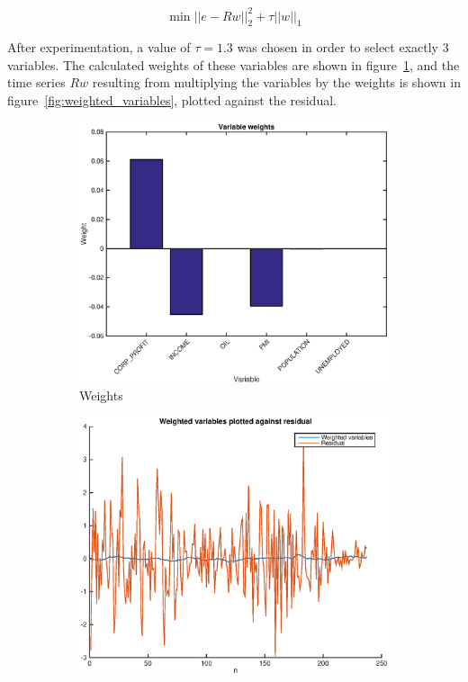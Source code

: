 \documentclass[12pt]{article}
\begin{document}
  \begin{equation}
    \min \left|\left|e - Rw\right|\right|_2^2 + \tau\left|\left|w\right|\right|_1
  \end{equation}

  After experimentation, a value of $\tau = 1.3$ was chosen in order to select exactly 3 variables. The calculated weights of these variables are shown in figure~\ref{fig:weights}, and the time series $Rw$ resulting from multiplying the variables by the weights is shown in figure~\ref{fig:weighted_variables}, plotted against the residual.

  \begin{figure}
    \centering
    \begin{subfigure}[b]{0.45\textwidth}
      \includegraphics[width=\textwidth]{figures/weights.eps}
      \caption{Weights}
      \label{fig:weights}
    \end{subfigure}
    \begin{subfigure}[b]{0.45\textwidth}
      \includegraphics[width=\textwidth]{figures/weighted_variables.eps}

\end{subfigure}
\end{figure}
\end{document}
